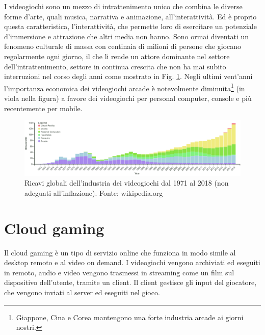 I videogiochi sono un mezzo di intrattenimento unico che combina le diverse forme d'arte, quali musica, narrativa e animazione, all'interattività. Ed è proprio questa caratteristica, l'interattività, che permette loro di esercitare un potenziale d'immersione e attrazione che altri media non hanno. Sono ormai diventati un fenomeno culturale di massa con centinaia di milioni di persone che giocano regolarmente ogni giorno, il che li rende un attore dominante nel settore dell'intrattenimento, settore in continua crescita che non ha mai subito interruzioni nel corso degli anni come mostrato in Fig. \ref{fig:valore_commerciale_giochi_globale}. Negli ultimi vent'anni l'importanza economica dei videogiochi arcade è notevolmente diminuita\footnote{Giappone, Cina e Corea mantengono una forte industria arcade ai giorni nostri.} (in viola nella figura) a favore dei videogiochi per personal computer, console e più recentemente per mobile.

\begin{figure}[H]
	\includegraphics[width=\linewidth]{immagini/valore_commerciale_giochi_globale.png}
	\caption{Ricavi globali dell'industria dei videogiochi dal 1971 al 2018 (non adeguati all'inflazione). Fonte: wikipedia.org}
	\label{fig:valore_commerciale_giochi_globale}
\end{figure}


\section{Cloud gaming}
Il cloud gaming è un tipo di servizio online che funziona in modo simile al desktop remoto e al video on demand. I videogiochi vengono archiviati ed eseguiti in remoto, audio e video vengono trasmessi in streaming come un film sul dispositivo dell'utente, tramite un client. Il client gestisce gli input del giocatore, che vengono inviati al server ed eseguiti nel gioco.

